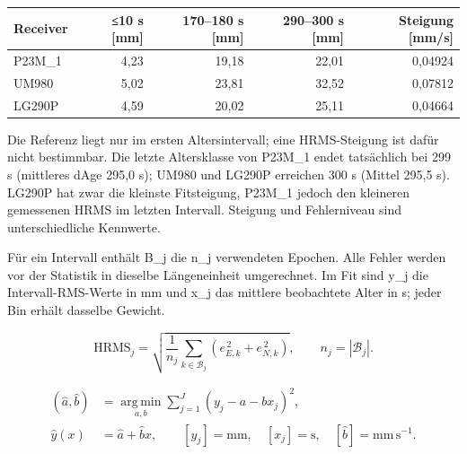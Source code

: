 \documentclass[11pt,a4paper]{article}
\numberwithin{equation}{section}
\numberwithin{figure}{section}
\begin{document}
\begin{center}\begin{lrbox}{\reporttable}\small\setlength{\tabcolsep}{4pt}\begin{tabular}{lrrrr}\toprule
Receiver & ≤10 s [mm] & 170–180 s [mm] & 290–300 s [mm] & Steigung [mm/\allowbreak{}s]\\\midrule
P23M\_1 & 4,23 & 19,18 & 22,01 & 0,04924\\
UM980 & 5,02 & 23,81 & 32,52 & 0,07812\\
LG290P & 4,59 & 20,02 & 25,11 & 0,04664\\
\bottomrule\end{tabular}\end{lrbox}\ifdim\wd\reporttable>\linewidth\resizebox{\linewidth}{!}{\usebox{\reporttable}}\else\usebox{\reporttable}\fi\end{center}

Die Referenz liegt nur im ersten Altersintervall; eine HRMS-Steigung ist dafür nicht bestimmbar. Die letzte Altersklasse von P23M\_1 endet tatsächlich bei 299 s (mittleres dAge 295,0 s); UM980 und LG290P erreichen 300 s (Mittel 295,5 s). LG290P hat zwar die kleinste Fitsteigung, P23M\_1 jedoch den kleineren gemessenen HRMS im letzten Intervall. Steigung und Fehlerniveau sind unterschiedliche Kennwerte.

Für ein Intervall enthält B\_j die n\_j verwendeten Epochen. Alle Fehler werden vor der Statistik in dieselbe Längeneinheit umgerechnet. Im Fit sind y\_j die Intervall-RMS-Werte in mm und x\_j das mittlere beobachtete Alter in s; jeder Bin erhält dasselbe Gewicht.

\begin{equation}\mathrm{HRMS}_j=\sqrt{\frac{1}{n_j}\sum_{k\in\mathcal B_j}\left(e_{E,k}^{\,2}+e_{N,k}^{\,2}\right)},\qquad n_j=|\mathcal B_j|.\label{eq:de-hrms}\end{equation}

\begin{equation}\begin{aligned}(\hat a,\hat b)&=\underset{a,b}{\operatorname{arg\,min}}\sum_{j=1}^{J}(y_j-a-bx_j)^2,\\ \hat y(x)&=\hat a+\hat b x,\qquad [y_j]=\mathrm{mm},\quad [x_j]=\mathrm{s},\quad [\hat b]=\mathrm{mm\,s^{-1}}.\end{aligned}\label{eq:de-fit}\end{equation}
\end{document}
